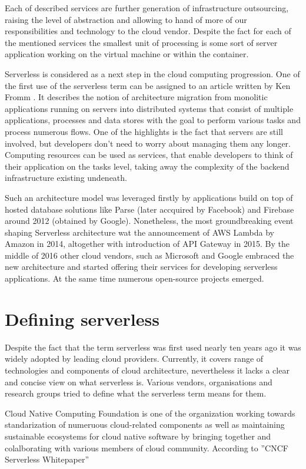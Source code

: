 Each of described services are further generation of infrastructure outsourcing, raising the level of abstraction and allowing to hand of more of our responsibilities and technology to the cloud vendor.
Despite the fact for each of the mentioned services the smallest unit of processing is some sort of server application working on the virtual machine or within the container.

Serverless is considered as a next step in the cloud computing progression. One of the first use of the serverless term can be assigned to an article written by Ken Fromm \cite{KenFromm}. It describes the notion of architecture migration from monolitic applications running on servers into distributed systems that consist of multiple applications, processes and data stores with the goal to perform various tasks and process numerous flows. One of the highlights is the fact that servers are still involved, but developers don't need to worry about managing them any longer. Computing resources can be used as services, that enable developers to think of their application on the tasks level, taking away the complexity of the backend infrastructure existing undeneath.

Such an architecture model was leveraged firstly by applications build on top of hosted database solutions like Parse (later accquired by Facebook) and Firebase around 2012 (obtained by Google). Nonetheless, the most groundbreaking event shaping Serverless architecture wat the announcement of AWS Lambda by Amazon in 2014, altogether with introduction of API Gateway in 2015. By the middle of 2016 other cloud vendors, such as Microsoft and Google embraced the new architecture and started offering their services for developing serverless applications. At the same time numerous open-source projects emerged.

\section{Defining serverless}

Despite the fact that the term serverless was first used nearly ten years ago it was widely adopted by leading cloud providers. Currently, it covers range of technologies and components of cloud architecture, nevertheless it lacks a clear and concise view on what serverless is. Various vendors, organisations and research groups tried to define what the serverless term means for them.

Cloud Native Computing Foundation is one of the organization working towards standarization of numeruous cloud-related components as well as maintaining sustainable ecosystems for cloud native software by bringing together and colalborating with various members of cloud community. According to ''CNCF Serverless Whitepaper'' \cite{CNCF}

